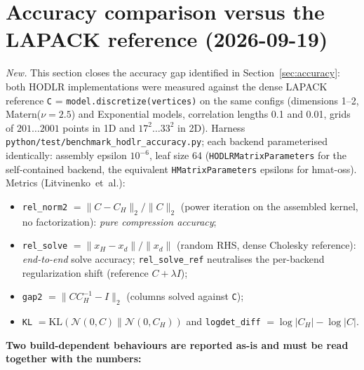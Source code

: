 \documentclass[11pt,a4paper]{article}
\begin{document}
\section{Accuracy comparison versus the LAPACK reference (2026-09-19)}\label{sec:acc-comparison}
\emph{New.} This section closes the accuracy gap identified in
Section~\ref{sec:accuracy}: both HODLR implementations were measured against the
dense LAPACK reference \texttt{C} = \texttt{model.discretize(vertices)} on the
same configs (dimensions 1--2, Matern($\nu{=}2.5$) and Exponential models,
correlation lengths 0.1 and 0.01, grids of $201\dots 2001$ points in 1D and
$17^{2}\dots 33^{2}$ in 2D).  Harness
\texttt{python/test/benchmark\_hodlr\_accuracy.py}; each backend parameterised
identically: assembly epsilon $10^{-6}$, leaf size 64
(\texttt{HODLRMatrixParameters} for the self-contained backend, the equivalent
\texttt{HMatrixParameters} epsilons for hmat-oss).  Metrics
(Litvinenko~et~al.):
\begin{itemize}
\item \texttt{rel\_norm2} $=\|C-C_H\|_2/\|C\|_2$ (power iteration on the
  assembled kernel, no factorization): \emph{pure compression accuracy};
\item \texttt{rel\_solve} $=\|x_H-x_d\|/\|x_d\|$ (random RHS, dense Cholesky
  reference): \emph{end-to-end} solve accuracy; \texttt{rel\_solve\_ref}
  neutralises the per-backend regularization shift (reference $C+\lambda I$);
\item \texttt{gap2} $=\|CC_H^{-1}-I\|_2$ (columns solved against \texttt{C});
\item \texttt{KL} $=\mathrm{KL}(\mathcal{N}(0,C)\|\mathcal{N}(0,C_H))$ and
  \texttt{logdet\_diff} $=\log|C_H|-\log|C|$.
\end{itemize}
\textbf{Two build-dependent behaviours are reported as-is and must be read
together with the numbers:}
\end{document}

